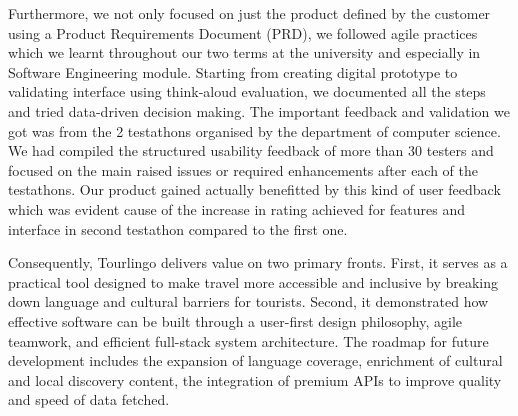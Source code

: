 Furthermore, we not only focused on just the product defined by the customer using a Product Requirements Document (PRD), we followed agile practices which we learnt throughout our two terms at the university and especially in Software Engineering module. Starting from creating digital prototype to validating interface using think-aloud evaluation, we documented all the steps and tried data-driven decision making. The important feedback and validation we got was from the 2 testathons organised by the department of computer science. We had compiled the structured usability feedback of more than 30 testers and focused on the main raised issues or required enhancements after each of the testathons. Our product gained actually benefitted by this kind of user feedback which was evident cause of the increase in rating achieved for features and interface in second testathon compared to the first one.

 Consequently, Tourlingo delivers value on two primary fronts. First, it serves as a practical tool designed to make travel more accessible and inclusive by breaking down language and cultural barriers for tourists. Second, it demonstrated how effective software can be built through a user-first design philosophy, agile teamwork, and efficient full-stack system architecture. The roadmap for future development includes the expansion of language coverage, enrichment of cultural and local discovery content, the integration of premium APIs to improve quality and speed of data fetched.